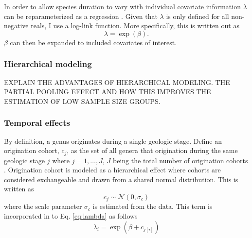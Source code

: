 \documentclass[12pt,letterpaper]{article}
\begin{document}
In order to allow species duration to vary with individual covariate information \(\lambda\) can be reparameterized as a regression \citep{Klein2003}. Given that \(\lambda\) is only defined for all non-negative reals, I use a log-link function. More specifically, this is written out as 
\begin{equation}
  \lambda = \exp(\beta).
  \label{eq:lambda}
\end{equation}
\(\beta\) can then be expanded to included covariates of interest.


\subsubsection{Hierarchical modeling}
\uppercase{Explain the advantages of hierarchical modeling. The partial pooling effect and how this improves the estimation of low sample size groups.}

\subsubsection{Temporal effects}

By definition, a genus originates during a single geologic stage. Define an origination cohort, \(c_{j}\), as the set of all genera that origination during the same geologic stage \(j\) where \(j = 1, \dots, J\), \(J\) being the total number of origination cohorts \citep{Raup1978}. Origination cohort is modeled as a hierarchical effect where cohorts are considered exchangeable and drawn from a shared normal distribution. This is written as 
\begin{equation}
  c_{j} \sim \mathcal{N}(0, \sigma_{c})
  \label{eq:cohort}
\end{equation}
where the scale parameter \(\sigma_{c}\) is estimated from the data. This term is incorporated in to Eq. \ref{eq:lambda} as follows
\begin{equation}
  \lambda_{i} = \exp(\beta + c_{j[i]})
  \label{eq:lambda_cohort}
\end{equation}
\end{document}
